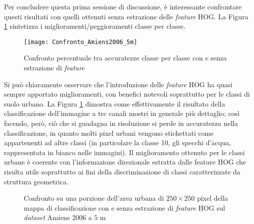 Per concludere questa prima sessione di discussione, è interessante
confrontare questi risultati con quelli ottenuti senza estrazione
delle \emph{feature} HOG. La Figura \ref{fig:Confronto_Amiens2006_5m}
sintetizza i miglioramenti/peggioramenti classe per classe.

\begin{figure}[!ht]

\texttt{[image: Confronto\_Amiens2006\_5m]}

\caption{Confronto percentuale tra accuratezze classe per classe con e
senza estrazione di \emph{feature}}

\label{fig:Confronto_Amiens2006_5m}

\end{figure}

Si può chiaramente osservare che l'introduzione delle \emph{feature}
HOG ha quasi sempre apportato miglioramenti, con benefici notevoli
soprattutto per le classi di suolo urbano. La Figura
\ref{fig:Confronto_Amiens2006_5m} dimostra come effettivamente il
risultato della classificazione dell'immagine a tre canali mostri in
generale più dettaglio; così facendo, però, ciò che si guadagna in
risoluzione si perde in accuratezza nella classificazione, in quanto
molti pixel urbani vengono etichettati come appartenenti ad altre
classi (in particolare la classe 10, gli specchi d'acqua,
rappresentata in bianco nelle immagini). Il miglioramento ottenuto per
le classi urbane è coerente con l'informazione direzionale estratta
dalle feature HOG che risulta utile soprattutto ai fini della
discriminazione di classi caratterizzate da struttura geometrica.

\begin{figure}[!ht]

\center


\hspace{2mm}


\caption{Confronto su una porzione dell'area urbana di $250\times250$
pixel della mappa di classificazione con e senza estrazione di
\emph{feature} HOG sul \emph{dataset} Amiens 2006 a $5$ m}

\label{fig:confrontoAmiens2006_5m}

\end{figure}

